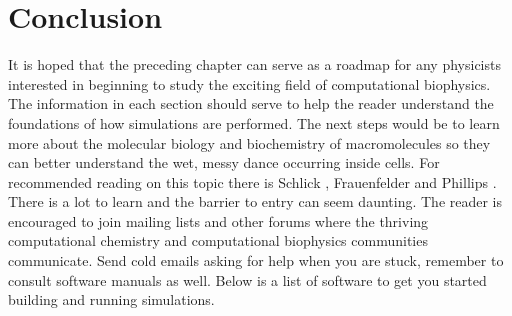 \section{Conclusion}
It is hoped that the preceding chapter can serve as a roadmap for any physicists interested in beginning to study the exciting field of computational biophysics. The information in each section should serve to help the reader understand the foundations of how simulations are performed. The next steps would be to learn more about the molecular biology and biochemistry of macromolecules so they can better understand the wet, messy dance occurring inside cells. For recommended reading on this topic there is Schlick \cite{schlick2010}, Frauenfelder \cite{frauenfelder2010} and Phillips \cite{phillips2019}. There is a lot to learn and the barrier to entry can seem daunting. The reader is encouraged to join mailing lists and other forums where the thriving computational chemistry and computational biophysics communities communicate. Send cold emails asking for help when you are stuck, remember to consult software manuals as well. Below is a list of software to get you started building and running simulations. 

